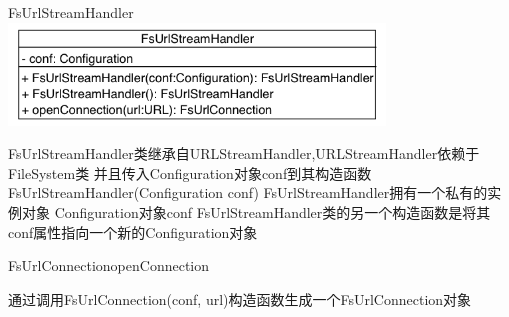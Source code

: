 \begin{XeClass}{FsUrlStreamHandler}
\includegraphics[width=10cm]{cdig/FsUrlStreamHandler.png}
     
 FsUrlStreamHandler类继承自URLStreamHandler,URLStreamHandler依赖于FileSystem类
 并且传入Configuration对象conf到其构造函数FsUrlStreamHandler(Configuration conf)
 FsUrlStreamHandler拥有一个私有的实例对象 Configuration对象conf
 FsUrlStreamHandler类的另一个构造函数是将其conf属性指向一个新的Configuration对象

    \begin{XeMethod}{\XeProtected}{FsUrlConnection}{openConnection}
         
 通过调用FsUrlConnection(conf, url)构造函数生成一个FsUrlConnection对象

    \end{XeMethod}

\end{XeClass}
